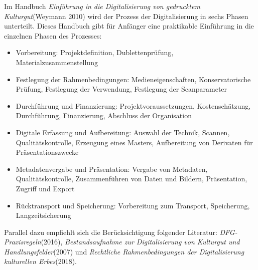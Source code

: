 \documentclass{article}
\begin{document}
        Im Handbuch \emph{Einführung in die Digitalisierung von gedrucktem
                     Kulturgut}(Weymann 2010) wird der Prozess der Digitalisierung in sechs Phasen
                  unterteilt. Dieses Handbuch gibt für Anfänger eine praktikable Einführung in die
                  einzelnen Phasen des Prozesses:\\
            
        \begin{itemize}\item { Vorbereitung: Projektdefinition, Dublettenprüfung, Materialzusammenstellung }\item { Festlegung der Rahmenbedingungen: Medieneigenschaften, Konservatorische
                     Prüfung, Festlegung der Verwendung, Festlegung der Scanparameter }\item { Durchführung und Finanzierung: Projektvoraussetzungen, Kostenschätzung,
                     Durchführung, Finanzierung, Abschluss der Organisation }\item { Digitale Erfassung und Aufbereitung: Auswahl der Technik, Scannen,
                     Qualitätskontrolle, Erzeugung eines Masters, Aufbereitung von Derivaten für
                     Präsentationszwecke }\item { Metadatenvergabe und Präsentation: Vergabe von Metadaten,
                     Qualitätskontrolle, Zusammenführen von Daten und Bildern, Präsentation, Zugriff
                     und Export }\item { Rücktransport und Speicherung: Vorbereitung zum Transport, Speicherung,
                     Langzeitsicherung }\end{itemize}Parallel dazu empfiehlt sich die Berücksichtigung folgender Literatur:
                  \emph{DFG-Praxisregeln}(2016), \emph{Bestandsaufnahme zur Digitalisierung von Kulturgut und
                  Handlungsfelder}(2007) und \emph{Rechtliche Rahmenbedingungen der Digitalisierung
                  kulturellen Erbes}(2018).\\
            
\end{document}
